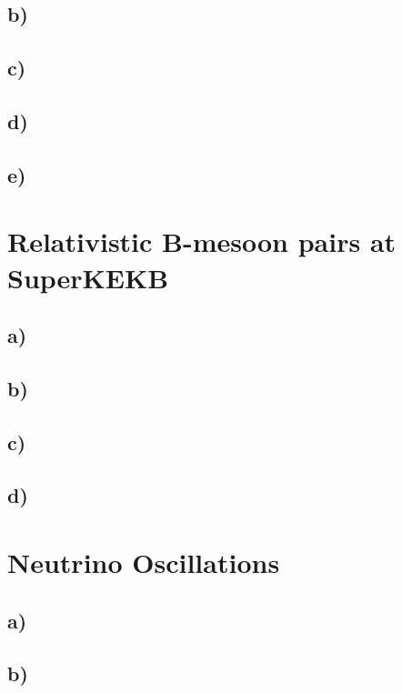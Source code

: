 \documentclass{article}
\begin{document}
\subsection*{b)}


\subsection*{c)}


\subsection*{d)}


\subsection*{e)}



\section{Relativistic B-mesoon pairs at SuperKEKB}
\subsection*{a)}


\subsection*{b)}


\subsection*{c)}


\subsection*{d)}




\section{Neutrino Oscillations}
\subsection*{a)}


\subsection*{b)}
\end{document}

